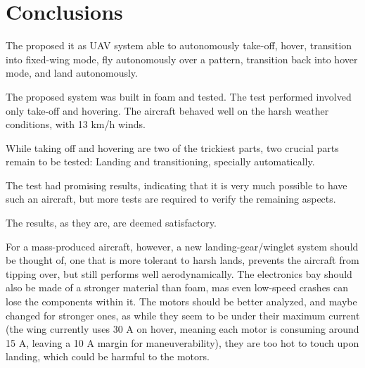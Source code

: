\chapter{Conclusions} \label{chap:conclusions}

The proposed it as UAV system able to autonomously take-off, hover, transition into fixed-wing mode, fly autonomously over a pattern, transition back into hover mode, and land autonomously.

The proposed system was built in foam and tested.
The test performed involved only take-off and hovering. The aircraft behaved well on the harsh weather conditions, with 13 km/h winds.

While taking off and hovering are two of the trickiest parts, two crucial parts remain to be tested: Landing and transitioning, specially automatically.

The test had promising results, indicating that it is very much possible to have such an aircraft, but more tests are required to verify the remaining aspects.

The results, as they are, are deemed satisfactory.

For a mass-produced aircraft, however, a new landing-gear/winglet system should be thought of, one that is more tolerant to harsh lands, prevents the aircraft from tipping over, but still performs well aerodynamically.
The electronics bay should also be made of a stronger material than foam, mas even low-speed crashes can lose the components within it.
The motors should be better analyzed, and maybe changed for stronger ones, as while they seem to be under their maximum current (the wing currently uses 30 A on hover, meaning each motor is consuming around 15 A, leaving a 10 A margin for maneuverability), they are too hot to touch upon landing, which could be harmful to the motors.